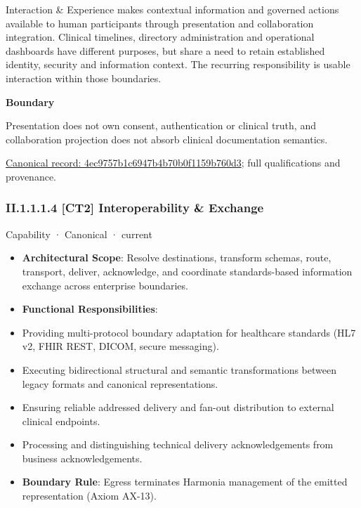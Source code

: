 Interaction \& Experience makes contextual information and governed actions available to human participants through presentation and collaboration integration. Clinical timelines, directory administration and operational dashboards have different purposes, but share a need to retain established identity, security and information context. The recurring responsibility is usable interaction within those boundaries.



\textbf{Boundary}



Presentation does not own consent, authentication or clinical truth, and collaboration projection does not absorb clinical documentation semantics.


{\footnotesize \href{../../../../../../../continuum/strategy/capability/4ec9757b1c6947b4b70b0f1159b760d3.md}{Canonical record: 4ec9757b1c6947b4b70b0f1159b760d3}; full qualifications and provenance.}\par
\subsubsection*{II.1.1.1.4 [CT2] Interoperability \& Exchange}
\label{navigation:II.1.1.1.4}

\label{element:0f2e5222874949d8b0cce234941ecb20}
{\small Capability · Canonical · current}\par

\begin{itemize}


\item \textbf{Architectural Scope}: Resolve destinations, transform schemas, route, transport, deliver, acknowledge, and coordinate standards-based information exchange across enterprise boundaries.

\item \textbf{Functional Responsibilities}:

\item Providing multi-protocol boundary adaptation for healthcare standards (HL7 v2, FHIR REST, DICOM, secure messaging).

\item Executing bidirectional structural and semantic transformations between legacy formats and canonical representations.

\item Ensuring reliable addressed delivery and fan-out distribution to external clinical endpoints.

\item Processing and distinguishing technical delivery acknowledgements from business acknowledgements.

\item \textbf{Boundary Rule}: Egress terminates Harmonia management of the emitted representation (Axiom AX-13).

\end{itemize}


